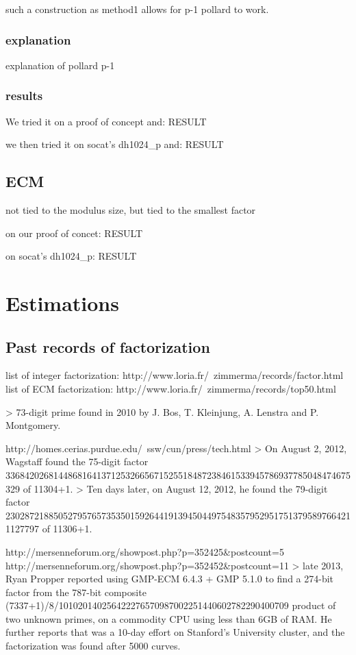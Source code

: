 \documentclass[a4paper,11pt]{article}
\begin{document}
such a construction as method1 allows for p-1 pollard to work.

\subsubsection{explanation}

explanation of pollard p-1

\subsubsection{results}

We tried it on a proof of concept and: RESULT

we then tried it on socat's dh1024_p and: RESULT

\subsection{ECM}

not tied to the modulus size, but tied to the smallest factor

on our proof of concet: RESULT

on socat's dh1024_p: RESULT

\section{Estimations}

\subsection{Past records of factorization}

list of integer factorization: http://www.loria.fr/~zimmerma/records/factor.html
list of ECM factorization: http://www.loria.fr/~zimmerma/records/top50.html

> 73-digit prime found in 2010 by J. Bos, T. Kleinjung, A. Lenstra and P. Montgomery.
 
http://homes.cerias.purdue.edu/~ssw/cun/press/tech.html
>  On August 2, 2012, Wagstaff found the 75-digit factor
336842026814486816413712532665671525518487238461533945786937785048474675329
of 11304+1.
> Ten days later, on August 12, 2012, he found the 79-digit factor
2302872188505279576573535015926441913945044975483579529517513795897664211127797
of 11306+1. 

http://mersenneforum.org/showpost.php?p=352425&postcount=5
http://mersenneforum.org/showpost.php?p=352452&postcount=11
> late 2013, Ryan Propper reported using GMP-ECM 6.4.3 + GMP 5.1.0 to find a 274-bit factor from the 787-bit composite (7337+1)/8/101020140256422276570987002251440602782290400709 product of two unknown primes, on a commodity CPU using less than 6GB of RAM. He further reports that was a 10-day effort on Stanford's University cluster, and the factorization was found after 5000 curves.
\end{document}
